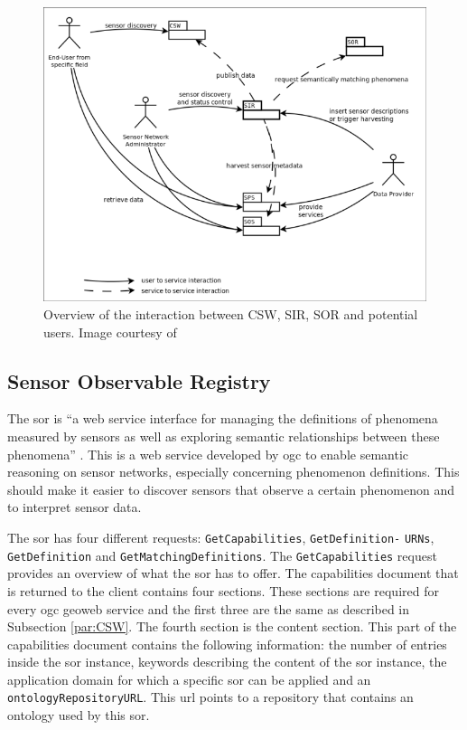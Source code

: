 \begin{figure}
	\centering
	\includegraphics[width=0.8\linewidth]{figs/sor_sir.png}
	\caption{Overview of the interaction between CSW, SIR, SOR and potential users. Image courtesy of \cite{SW:52North2}}
	\label{fig:SorSir}
\end{figure}

\subsection{Sensor Observable Registry}
\label{par:SOR}
The \ac{sor} is \enquote{a web service interface for managing the definitions of phenomena measured by sensors as well as exploring semantic relationships between these phenomena} \cite[p. vi]{SW:OGC4}. This is a web service developed by \ac{ogc} to enable semantic reasoning on sensor networks, especially concerning phenomenon definitions. This should make it easier to discover sensors that observe a certain phenomenon and to interpret sensor data.

The \ac{sor} has four different requests: \texttt{GetCapabilities}, \texttt{GetDefinition-} \texttt{URNs}, \texttt{GetDefinition} and \texttt{GetMatchingDefinitions}. The \texttt{GetCapabilities} request provides an overview of what the \ac{sor} has to offer. The capabilities document that is returned to the client contains four sections. These sections are required for every \ac{ogc} geoweb service and the first three are the same as described in Subsection \ref{par:CSW}. The fourth section is the content section. This part of the capabilities document contains the following information: the number of entries inside the \ac{sor} instance, keywords describing the content of the \ac{sor} instance, the application domain for which a specific \ac{sor} can be applied and an \texttt{ontologyRepositoryURL}. This \ac{url} points to a repository that contains an ontology used by this \ac{sor}.

